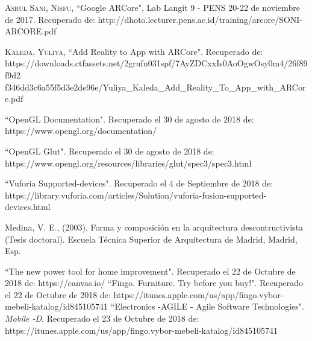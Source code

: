 \begin{thebibliography}{X}
	
	 \textsc{Asrul Sani, Nisfu}, ``Google ARCore", Lab Langit 9 - PENS 20-22 de noviembre de 2017. Recuperado de: http://dhoto.lecturer.pens.ac.id/training/arcore/SONI-ARCORE.pdf
	
	 \textsc{Kaleda, Yuliya}, ``Add Reality to App with ARCore". Recuperado de: https://downloads.ctfassets.net/2grufn031spf/7AyZDCxxIs0AoOgwOsy0m4/26f89f9d2
	f346dd3c6a55f5d3e2de96e/Yuliya\_Kaleda\_Add\_Reality\_To\_App\_with\_ARCore.pdf
	

	
	
	
	 ``OpenGL Documentation". Recuperado el 30 de agosto de 2018 de: https://www.opengl.org/documentation/
	
	 ``OpenGL Glut". Recuperado el 30 de agosto de 2018 de: https://www.opengl.org/resources/libraries/glut/spec3/spec3.html
	
    
	
	 ``Vuforia Supported-devices". Recuperado el 4 de Septiembre de 2018 de: https://library.vuforia.com/articles/Solution/vuforia-fusion-supported-devices.html
	
	 Medina, V. E., (2003). Forma y composición en la arquitectura descontructivista (Tesis doctoral). Escuela Técnica Superior de Arquitectura de Madrid, Madrid, Esp.
	
	 ``The new power tool for home improvement". Recuperado el 22 de Octubre de 2018 de: https://canvas.io/
	 ``Fingo. Furniture. Try before you buy!". Recuperado el 22 de Octubre de 2018 de: https://itunes.apple.com/us/app/fingo.vybor-mebeli-katalog/id845105741
	 ``Electronics -AGILE - Agile Software Technologies". \textit{Mobile -D}. Recuperado el 23 de Octubre de 2018 de: https://itunes.apple.com/us/app/fingo.vybor-mebeli-katalog/id845105741
	
	
\end{thebibliography}
